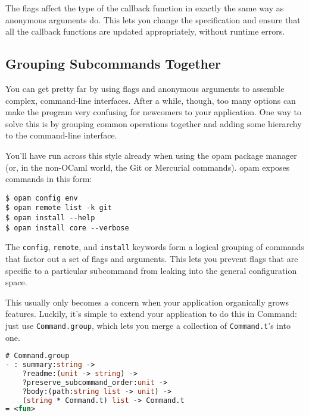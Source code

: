 The flags affect the type of the callback function in exactly the same
way as anonymous arguments do. This lets you change the specification
and ensure that all the callback functions are updated appropriately,
without runtime errors.

\hypertarget{grouping-sub-commands-together}{%
\subsection{Grouping Subcommands
Together}\label{grouping-sub-commands-together}}

You can get pretty far by using flags and anonymous arguments to
assemble complex, command-line interfaces. After a while, though, too
many options can make the program very confusing for newcomers to your
application. One way to solve this is by grouping common operations
together and adding some hierarchy to the command-line interface.

You'll have run across this style already when using the opam package
manager (or, in the non-OCaml world, the Git or Mercurial commands).
opam exposes commands in this form:

\begin{lstlisting}
$ opam config env
$ opam remote list -k git
$ opam install --help
$ opam install core --verbose
\end{lstlisting}

The \passthrough{\lstinline!config!}, \passthrough{\lstinline!remote!},
and \passthrough{\lstinline!install!} keywords form a logical grouping
of commands that factor out a set of flags and arguments. This lets you
prevent flags that are specific to a particular subcommand from leaking
into the general configuration space.

This usually only becomes a concern when your application organically
grows features. Luckily, it's simple to extend your application to do
this in Command: just use \passthrough{\lstinline!Command.group!}, which
lets you merge a collection of \passthrough{\lstinline!Command.t!}'s
into one. 

\begin{lstlisting}[language=Caml]
# Command.group
- : summary:string ->
    ?readme:(unit -> string) ->
    ?preserve_subcommand_order:unit ->
    ?body:(path:string list -> unit) ->
    (string * Command.t) list -> Command.t
= <fun>
\end{lstlisting}

